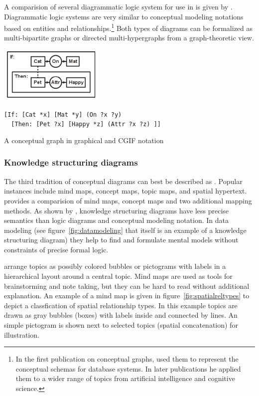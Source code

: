A comparision of several diagrammatic logic system for use in  is given by \textcite{Sowa1992b}. Diagrammatic logic systems are
very similar to conceptual modeling notations based on entities and
relationships.\footnote{In the first publication on conceptual graphs,
\textcite{Sowa1976} used them to represent the conceptual schemas for database
systems. In later publications he applied them to a wider range of topics from
artificial intelligence and cognitive science.} Both types of diagrams can be
formalized as multi-bipartite graphs or directed multi-hypergraphs from a
graph-theoretic view. 

\begin{example}
\centering
\includegraphics[width=5cm]{img/sowa2008fig7.png}

\verb|[If: [Cat *x] [Mat *y] (On ?x ?y)| \\
\verb|  [Then: [Pet ?x] [Happy *z] (Attr ?x ?z) ]]|

\caption{A conceptual graph in graphical and CGIF notation}
\label{ex:cgif}
\end{example}

\subsubsection{Knowledge structuring diagrams}

The third tradition of conceptual diagrams can best be described as
. Popular instances include mind maps,
concept maps, topic maps, and spatial hypertext. \textcite{Eppler2006} provides
a comparision of mind maps, concept maps and two additional mapping methods.
As shown by \textcite{Sowa2006}, knowledge structuring diagrams have less
precise semantics than logic diagrams and conceptual modeling notation.  In
data modeling (see figure~\ref{fig:datamodeling} that itself is an example of a
knowledge structuring diagram) they help to find and formulate mental models
without constraints of precise formal logic.

 \cite{Buzan1996} arrange topics as possibly colored
bubbles or pictograms with labels in a hierarchical layout around a central
topic. Mind maps are used as tools for brainstorming and note taking, but they
can be hard to read without additional explanation. An example of a mind map is
given in figure~\ref{fig:spatialreltypes} to depict a classfication of spatial
relationship types. In this example topics are drawn as gray bubbles (boxes)
with labels inside and connected by lines. An simple pictogram is shown next to
selected topics (spatial concatenation) for illustration.

